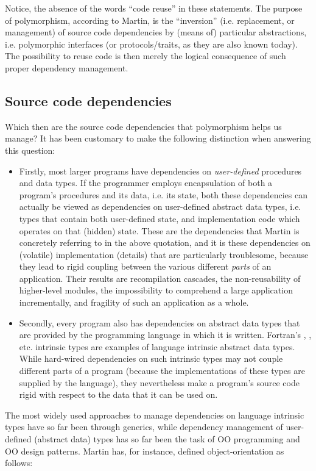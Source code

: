 \documentclass[11pt,oneside]{article}
\newcommand{\code}[1]{{\selectfont\ttfamily{#1}}}
\begin{document}
Notice, the absence of the words ``code reuse'' in these statements.
The purpose of polymorphism, according to Martin, is the ``inversion''
(i.e. replacement, or management) of source code dependencies by
(means of) particular abstractions, i.e. polymorphic interfaces (or
protocols/traits, as they are also known today). The possibility to
reuse code is then merely the logical consequence of such proper
dependency management.

\subsection{Source code dependencies}

Which then are the source code dependencies that polymorphism helps us
manage? It has been customary to make the following distinction when
answering this question:
\begin{itemize}
\item
 Firstly, most larger programs have dependencies on
 \emph{user-defined} procedures and data types. If the programmer
 employs encapsulation of both a program's procedures and its data,
 i.e. its state, both these dependencies can actually be viewed as
 dependencies on user-defined abstract data types, i.e. types that
 contain both user-defined state, and implementation code which
 operates on that (hidden) state. These are the dependencies that
 Martin is concretely referring to in the above quotation, and it is
 these dependencies on (volatile) implementation (details) that are
 particularly troublesome, because they lead to rigid coupling between
 the various different \emph{parts} of an application. Their results
 are recompilation cascades, the non-reusability of higher-level
 modules, the impossibility to comprehend a large application
 incrementally, and fragility of such an application as a whole.
\item
 Secondly, every program also has dependencies on abstract data types
 that are provided by the programming language in which it is written.
 Fortran's \code{integer}, \code{real}, etc. intrinsic types are
 examples of language intrinsic abstract data types. While hard-wired
 dependencies on such intrinsic types may not couple different parts
 of a program (because the implementations of these types are supplied
 by the language), they nevertheless make a program's source code
 rigid with respect to the data that it can be used on.
\end{itemize}

The most widely used approaches to manage dependencies on language
intrinsic types have so far been through generics, while dependency
management of user-defined (abstract data) types has so far been the
task of OO programming and OO design patterns. Martin \cite{Martin_17}
has, for instance, defined object-orientation as follows:
\end{document}
